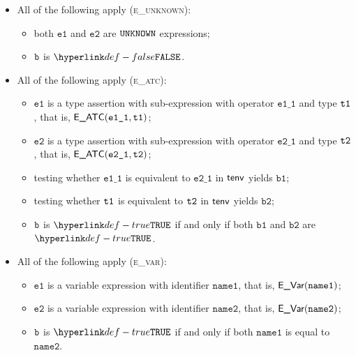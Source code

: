 \documentclass{book}
\newcommand\veone[0]{\texttt{e1}}
\newcommand\vetwo[0]{\texttt{e2}}
\newcommand\veoneone[0]{\texttt{e1\_1}}
\newcommand\vetwoone[0]{\texttt{e2\_1}}
\newcommand\vbone[0]{\texttt{b1}}
\newcommand\vbtwo[0]{\texttt{b2}}
\newcommand\nameone[0]{\texttt{name1}}
\newcommand\nametwo[0]{\texttt{name2}}
\begin{document}
\begin{itemize}
  \item All of the following apply (\textsc{e\_unknown}):
  \begin{itemize}
    \item both $\veone$ and $\vetwo$ are $\texttt{UNKNOWN}$ expressions;
    \item $\texttt{b}$ is $\False$.
  \end{itemize}

  \item All of the following apply (\textsc{e\_atc}):
  \begin{itemize}
    \item $\veone$ is a type assertion with sub-expression with operator $\veoneone$ and type $\texttt{t1}$,
          that is, $\EATC(\veoneone, \vtone)$;
    \item $\vetwo$ is a type assertion with sub-expression with operator $\vetwoone$ and type $\texttt{t2}$,
          that is, $\EATC(\vetwoone, \vttwo)$;
    \item testing whether $\veoneone$ is equivalent to $\vetwoone$ in $\textsf{tenv}$ yields $\vbone$;
    \item testing whether $\texttt{t1}$ is equivalent to $\texttt{t2}$ in $\textsf{tenv}$ yields $\vbtwo$;
    \item $\texttt{b}$ is $\True$ if and only if both $\vbone$ and $\vbtwo$ are $\True$.
  \end{itemize}

  \item All of the following apply (\textsc{e\_var}):
  \begin{itemize}
    \item $\veone$ is a variable expression with identifier $\nameone$, that is, $\EVar(\nameone)$;
    \item $\vetwo$ is a variable expression with identifier $\nametwo$, that is, $\EVar(\nametwo)$;
    \item $\texttt{b}$ is $\True$ if and only if both $\nameone$ is equal to $\nametwo$.
  \end{itemize}
\end{itemize}
\end{document}
